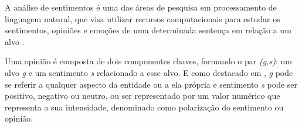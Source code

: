 A análise de sentimentos é uma das áreas de pesquisa em processamento de linguagem natural, que visa utilizar recursos computacionais para estudar os sentimentos, opiniões e emoções de uma determinada sentença em relação a um alvo \cite{Bellini2019}.

Uma opinião é composta de dois componentes chaves, formando o par \emph{(g,s)}: um alvo \emph{g} e um sentimento \emph{s} relacionado a esse alvo. E como destacado em \cite{Machado2018}, \emph{g} pode se referir a qualquer aspecto da entidade ou a ela própria e sentimento \emph{s} pode ser positivo, negativo ou neutro, ou ser representado por um valor numérico que representa a sua intensidade, denominado como polarização do sentimento ou opinião.




